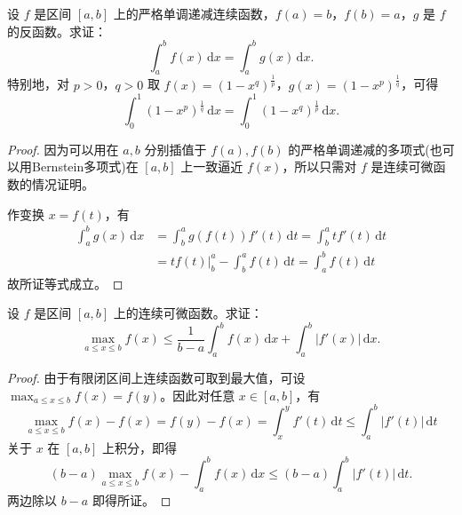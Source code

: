\documentclass[../../main.tex]{subfiles}
\begin{document}
\begin{proposition}
设 \( f \) 是区间 \([a,b]\) 上的严格单调递减连续函数，\( f(a) = b \)，\( f(b) = a \)，\( g \) 是 \( f \) 的反函数。求证：
\[
\int_{a}^{b} f(x) \, \mathrm{d}x = \int_{a}^{b} g(x) \, \mathrm{d}x.
\]
特别地，对 \( p > 0 \)，\( q > 0 \) 取 \( f(x) = (1 - x^{q})^{\frac{1}{p}} \)，\( g(x) = (1 - x^{p})^{\frac{1}{q}} \)，可得
\[
\int_{0}^{1} (1 - x^{p})^{\frac{1}{q}} \, \mathrm{d}x = \int_{0}^{1} (1 - x^{q})^{\frac{1}{p}} \, \mathrm{d}x.
\]
\end{proposition}
\begin{proof}
因为可以用在 \( a,b \) 分别插值于 \( f(a),f(b) \) 的严格单调递减的多项式(也可以用Bernstein多项式)在 \([a,b]\) 上一致逼近 \( f(x) \)，所以只需对 \( f \) 是连续可微函数的情况证明。

作变换 \( x = f(t) \)，有
\begin{align*}
\int_{a}^{b} g(x) \, \mathrm{d}x &= \int_{b}^{a} g(f(t))f'(t) \, \mathrm{d}t = \int_{b}^{a} t f'(t) \, \mathrm{d}t \\
&= t f(t) \Big |_{b}^{a} - \int_{b}^{a} f(t) \, \mathrm{d}t = \int_{a}^{b} f(t) \, \mathrm{d}t
\end{align*}
故所证等式成立。

\end{proof}

\begin{example}
设 \( f \) 是区间 \([a,b]\) 上的连续可微函数。求证：
\[
\max_{a\leqslant x\leqslant b} f(x)\leqslant \frac{1}{b-a}\int_a^b{f(x)\,\mathrm{d}x}+\int_a^b{|f' (x)|\,\mathrm{d}x}.
\]
\end{example}
\begin{proof}
由于有限闭区间上连续函数可取到最大值，可设 \( \max_{a \leqslant x \leqslant b} f(x) = f(y) \)。因此对任意 \( x \in [a,b] \)，有
\[
\max_{a \leqslant x \leqslant b} f(x) - f(x) = f(y) - f(x) = \int_{x}^{y} f'(t) \, \mathrm{d}t \leqslant \int_{a}^{b} |f'(t)| \, \mathrm{d}t
\]
关于 \( x \) 在 \([a,b]\) 上积分，即得
\[
(b - a) \max_{a \leqslant x \leqslant b} f(x) - \int_{a}^{b} f(x) \, \mathrm{d}x \leqslant (b-a)\int_{a}^{b} |f'(t)| \, \mathrm{d}t.
\]
两边除以 \( b - a \) 即得所证。

\end{proof}
\end{document}
